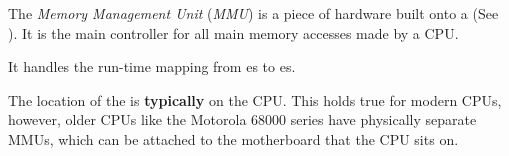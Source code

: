 \begin{definition}\label{def:Memory_Management_Unit}
  The \emph{Memory Management Unit} (\emph{MMU}) is a piece of hardware built onto a  (See ).
  It is the main controller for all main memory accesses made by a CPU.\@

  It handles the run-time mapping from es to es.

  \begin{remark}\label{rmk:MMU_Location}
    The location of the  is \textbf{typically} on the CPU.\@
    This holds true for modern CPUs, however, older CPUs like the Motorola 68000 series have physically separate MMUs, which can be attached to the motherboard that the CPU sits on.
  \end{remark}
\end{definition}











